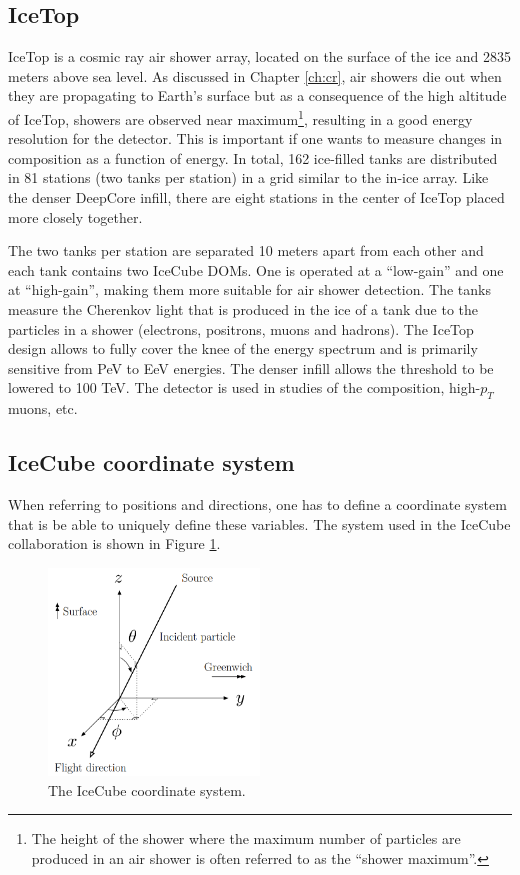 \subsection{IceTop}
IceTop is a cosmic ray air shower array, located on the surface of the ice and 2835 meters above sea level. As discussed in Chapter \ref{ch:cr}, air showers die out when they are propagating to Earth's surface but as a consequence of the high altitude of IceTop, showers are observed near maximum\footnote{The height of the shower where the maximum number of particles are produced in an air shower is often referred to as the ``shower maximum''.}, resulting in a good energy resolution for the detector. This is important if one wants to measure changes in composition as a function of energy. In total, 162 ice-filled tanks are distributed in 81 stations (two tanks per station) in a grid similar to the in-ice array. Like the denser DeepCore infill, there are eight stations in the center of IceTop placed more closely together. 

The two tanks per station are separated 10 meters apart from each other and each tank contains two IceCube DOMs. One is operated at a ``low-gain'' and one at ``high-gain'', making them more suitable for air shower detection. The tanks measure the Cherenkov light that is produced in the ice of a tank due to the particles in a shower (electrons, positrons, muons and hadrons). The IceTop design allows to fully cover the knee of the energy spectrum and is primarily sensitive from PeV to EeV energies. The denser infill allows the threshold to be lowered to 100 TeV. The detector is used in studies of the composition, high-$p_T$ muons, etc. 

\subsection{IceCube coordinate system}
When referring to positions and directions, one has to define a coordinate system that is be able to uniquely define these variables. The system used in the IceCube collaboration is shown in Figure \ref{fig:coordinates}.\\

\begin{figure}[t]
\centering
\includegraphics[width=0.5\textwidth]{chapter7/img/CoordinateSystem.png}
\caption{The IceCube coordinate system.}
\label{fig:coordinates}
\end{figure}

